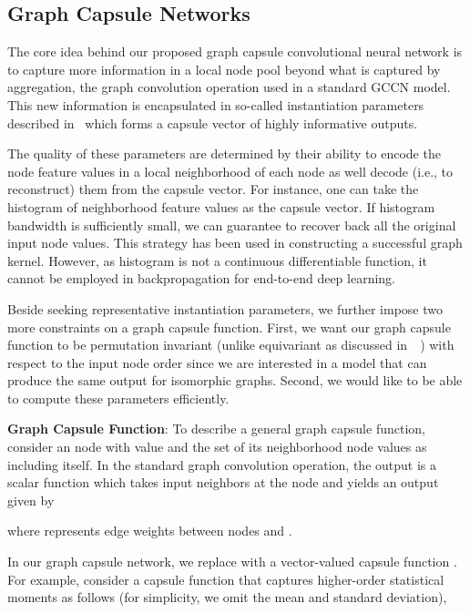 \documentclass{article}
\begin{document}
\subsection{Graph Capsule Networks}\label{sec:graph_capsule}


The core idea behind our proposed graph capsule convolutional neural network is to   capture more information in a local node pool  beyond what is captured by aggregation, the graph convolution operation used in a standard GCCN model. This new information is encapsulated in so-called  instantiation parameters described in~\cite{hinton2011transforming} which forms a capsule vector of highly informative outputs. 

The quality of these  parameters are determined by their ability to encode the node feature values in a local neighborhood of each node  as well decode (i.e., to reconstruct) them from the capsule vector. For instance, one can take the histogram of neighborhood feature values as the  capsule vector. If histogram bandwidth is sufficiently small, we can guarantee to recover back  all the original input node   values. This strategy has been used  in constructing a successful graph kernel. However, as histogram is not a continuous differentiable function, it cannot be employed in backpropagation for  end-to-end deep learning.

Beside seeking representative instantiation parameters, we further impose two  more constraints on a graph capsule function. First, we  want our graph capsule function to be  permutation invariant (unlike equivariant as discussed in~~\cite{hinton2011transforming})  with respect to the input node order since  we are interested in a model that can produce the same output for isomorphic graphs.  Second,  we would like   to be able to compute these parameters efficiently.

\noindent \textbf{Graph Capsule Function}: To describe a general graph capsule function, consider an  node  with  value and the set of its neighborhood node values as  including itself. In the standard graph convolution operation, the output is a scalar function  which takes   input neighbors at the  node and yields an output given by


where  represents   edge weights between nodes  and . 

In our graph capsule network, we replace  with a vector-valued capsule function . For example, consider a  capsule function that captures higher-order statistical moments as follows (for simplicity, we omit the mean and standard deviation),
\end{document}
